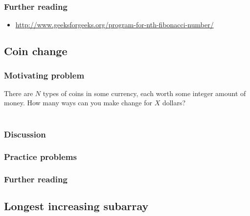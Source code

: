 \subsubsection*{Further reading}

\begin{itemize}
\item \url{http://www.geeksforgeeks.org/program-for-nth-fibonacci-number/}
\end{itemize}

\subsection{Coin change}

\subsubsection*{Motivating problem}


There are $N$ types of coins in some currency, each worth some integer amount of money. How many ways can you make change for $X$ dollars?


\begin{gather*}

\end{gather*}





\subsubsection*{Discussion}

\subsubsection*{Practice problems}

\subsubsection*{Further reading}

\subsection{Longest increasing subarray}


